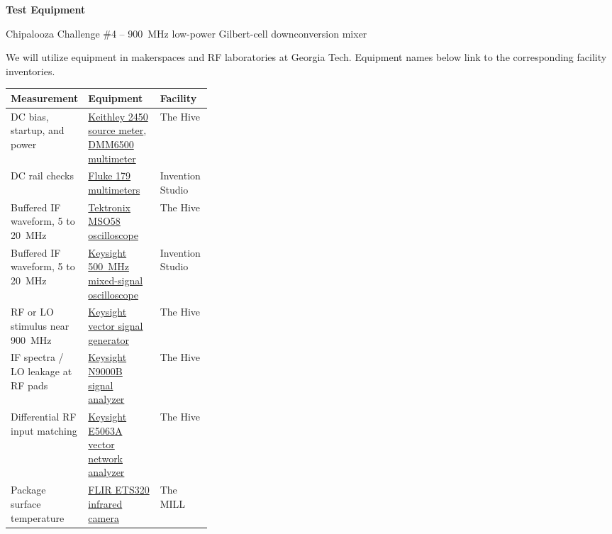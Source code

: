 \documentclass[11pt,letterpaper]{article}
\begin{document}
\raggedright

{\LARGE\bfseries Test Equipment\par}
{\large Chipalooza Challenge \#4 -- 900~MHz low-power Gilbert-cell downconversion mixer\par}

We will utilize equipment in makerspaces and RF laboratories at Georgia Tech.
Equipment names below link to the corresponding facility inventories.

\smallskip
\begingroup
\small
\renewcommand{\arraystretch}{1.23}
\begin{tabularx}{\linewidth}{@{}>{\raggedright\arraybackslash}p{0.33\linewidth}
                                >{\raggedright\arraybackslash}X l@{}}
\toprule
\textbf{Measurement} & \textbf{Equipment} & \textbf{Facility} \\
\midrule
DC bias, startup, and power &
    \href{https://wiki.hivemakerspace.com/explore/electronics-benchtop/}{Keithley 2450 source meter}, \href{https://wiki.hivemakerspace.com/explore/electronics-benchtop/}{DMM6500 multimeter} & The Hive \\
DC rail checks &
    \href{https://inventionstudio.gatech.edu/tools-equipment/electronics/}{Fluke 179 multimeters} & Invention Studio \\
Buffered IF waveform, 5 to 20~MHz &
    \href{https://wiki.hivemakerspace.com/explore/electronics-benchtop/}{Tektronix MSO58 oscilloscope} & The Hive \\
Buffered IF waveform, 5 to 20~MHz &
    \href{https://inventionstudio.gatech.edu/tools-equipment/electronics/}{Keysight 500~MHz mixed-signal oscilloscope} & Invention Studio \\
RF or LO stimulus near 900~MHz &
    \href{https://wiki.hivemakerspace.com/explore/electronics-benchtop/}{Keysight vector signal generator} & The Hive \\
IF spectra / LO leakage at RF pads &
    \href{https://wiki.hivemakerspace.com/explore/electronics-benchtop/}{Keysight N9000B signal analyzer} & The Hive \\
Differential RF input matching &
    \href{https://wiki.hivemakerspace.com/explore/electronics-benchtop/}{Keysight E5063A vector network analyzer} & The Hive \\
Package surface temperature &
    \href{https://mill.mse.gatech.edu/equipment/measurement-team/}{FLIR ETS320 infrared camera} & The MILL \\
\bottomrule
\end{tabularx}
\endgroup
\end{document}

